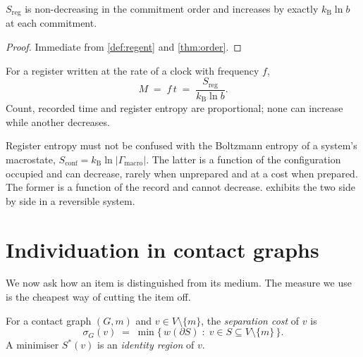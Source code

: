 \documentclass[10pt,twocolumn,a4paper]{article}
\newcommand{\kB}{k_{\mathrm{B}}}
\newcommand{\med}{m}
\newcommand{\sep}{\sigma}
\newcommand{\cut}{\partial}
\begin{document}
\begin{proposition}
\label{prop:regent}
$S_{\mathrm{reg}}$ is non-decreasing in the commitment order and increases by
exactly $\kB\ln b$ at each commitment.
\end{proposition}

\begin{proof}
Immediate from \cref{def:regent} and \cref{thm:order}.
\end{proof}

\begin{corollary}
\label{cor:three}
For a register written at the rate of a clock with frequency $f$,
\begin{equation}
M \;=\; f\,t \;=\; \frac{S_{\mathrm{reg}}}{\kB\ln b}.
\label{eq:three}
\end{equation}
Count, recorded time and register entropy are proportional; none can
increase while another decreases.
\end{corollary}

\begin{remark}
\label{rem:two-entropies}
Register entropy must not be confused with the Boltzmann entropy of a
system's macrostate, $S_{\mathrm{conf}}=\kB\ln|\Gamma_{\mathrm{macro}}|$. The
latter is a function of the configuration occupied and can decrease, rarely
when unprepared and at a cost when prepared. The former is a function of the
record and cannot decrease.  exhibits the two side by
side in a reversible system.
\end{remark}

\section{Individuation in contact graphs}
\label{sec:individuation}

We now ask how an item is distinguished from its medium. The measure we use
is the cheapest way of cutting the item off.

\begin{definition}
\label{def:sep}
For a contact graph $(G,\med)$ and $v\in V\setminus\{\med\}$, the
\emph{separation cost} of $v$ is
\begin{equation}
\sep_G(v)\;=\;\min\bigl\{\,w(\cut S)\;:\;v\in S\subseteq V\setminus\{\med\}\,\bigr\}.
\label{eq:sep}
\end{equation}
A minimiser $S^{*}(v)$ is an \emph{identity region} of $v$.
\end{definition}
\end{document}
